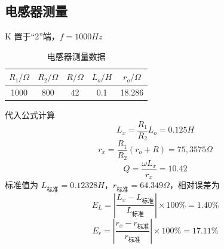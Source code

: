 \documentclass[12pt]{article}
\begin{document}
\subsection{电感器测量}
\begin{table}[H]
    \centering
    \caption{电感器测量数据}
    \begin{minipage}{0.7\textwidth}
        \raggedleft
        K 置于“2”端，$f=1000Hz$
    \end{minipage}
    \begin{tabular}{ccccc}
        \hline\hline
        $R_1/\Omega$  & $R_2/\Omega$     & $R/\Omega$     & $L_o/H$ & $r_o/\Omega$   \\ \hline
        1000& 800 & 42 & 0.1 & 18.286 \\\hline\hline
       
    \end{tabular}
\end{table}
代入公式计算
\begin{equation}
    L_x=\frac{R_1}{R_2}L_o=0.125 H
\end{equation}
\begin{equation}
    r_x=\frac{R_1}{R_2}(r_o+R)=75,3575\Omega
\end{equation}
\begin{equation}
    Q=\frac{\omega L_x}{r_x}=10.42
\end{equation}
标准值为 $L_{标准}=0.12328 H$，$r_{标准}=64.349\Omega$，相对误差为
\begin{equation}
    E_{L}=\left|\dfrac{L_x-L_{标准}}{L_{标准}} \right|\times 100\%=1.40\%
\end{equation}
\begin{equation}
    E_{r}=\left|\dfrac{r_x-r_{标准}}{r_{标准}} \right|\times 100\%=17.11\%
\end{equation}
\end{document}
